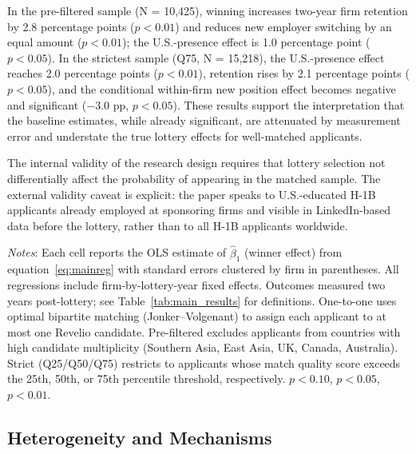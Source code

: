 In the pre-filtered sample (N = 10,425), winning increases two-year firm retention by 2.8 percentage points ($p < 0.01$) and reduces new employer switching by an equal amount ($p < 0.01$); the U.S.-presence effect is 1.0 percentage point ($p < 0.05$). In the strictest sample (Q75, N = 15,218), the U.S.-presence effect reaches 2.0 percentage points ($p < 0.01$), retention rises by 2.1 percentage points ($p < 0.05$), and the conditional within-firm new position effect becomes negative and significant ($-$3.0 pp, $p < 0.05$). These results support the interpretation that the baseline estimates, while already significant, are attenuated by measurement error and understate the true lottery effects for well-matched applicants.

The internal validity of the research design requires that lottery selection not differentially affect the probability of appearing in the matched sample. The external validity caveat is explicit: the paper speaks to U.S.-educated H-1B applicants already employed at sponsoring firms and visible in LinkedIn-based data before the lottery, rather than to all H-1B applicants worldwide.

\begin{table}[htbp]
\centering
\caption{Robustness: Winner Effects Across Sample Variants}
\label{tab:robustness}
\footnotesize

\begin{tablenotes}
\item \textit{Notes}: Each cell reports the OLS estimate of $\hat\beta_1$ (winner effect) from equation~\eqref{eq:mainreg} with standard errors clustered by firm in parentheses. All regressions include firm-by-lottery-year fixed effects. Outcomes measured two years post-lottery; see Table~\ref{tab:main_results} for definitions. One-to-one uses optimal bipartite matching (Jonker--Volgenant) to assign each applicant to at most one Revelio candidate. Pre-filtered excludes applicants from countries with high candidate multiplicity (Southern Asia, East Asia, UK, Canada, Australia). Strict (Q25/Q50/Q75) restricts to applicants whose match quality score exceeds the 25th, 50th, or 75th percentile threshold, respectively. \sym{*} $p<0.10$, \sym{**} $p<0.05$, \sym{***} $p<0.01$.
\end{tablenotes}
\end{table}



\subsection{Heterogeneity and Mechanisms}

